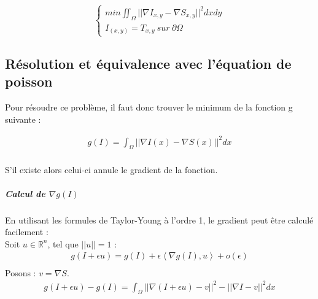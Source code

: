\begin{center}
\begin{equation}
\left\{
\begin{aligned}
 min \iint_\Omega || \nabla I_{x,y} - \nabla S_{x,y}||^2 dxdy\\
 I_{(x,y)} = T_{x,y} \ sur\ \partial \Omega
\end{aligned}
\right.
\end{equation}
\end{center}


\subsection{Résolution et équivalence avec l'équation de poisson}
Pour résoudre ce problème, il faut donc trouver le minimum de la fonction g suivante  : 
\begin{center}
\begin{equation}
\begin{aligned}
g(I) = \int_\Omega || \nabla I(x) - \nabla S(x)||^2 dx\\
\end{aligned}
\end{equation}
\end{center}
S'il existe alors celui-ci annule le gradient de la fonction. 
\subparagraph{Calcul de $\nabla g(I)$ }
En utilisant les formules de Taylor-Young à l'ordre 1, le gradient peut être calculé facilement :\\
Soit $u \in \mathbb{R}^n$, tel que $||u||=1$ :
\begin{equation*}
\begin{aligned}
g(I+\epsilon u) = g(I) +\epsilon \left<\nabla g(I), u\right> + o(\epsilon)\\
\end{aligned}
\end{equation*}
Posons : $v = \nabla S$.
\begin{equation*} 
\begin{aligned}
    g(I+\epsilon u) -g(I) =  \int_\Omega || \nabla (I+\epsilon u) - v||^2 - ||\nabla I -v ||^2 dx\\
\end{aligned}
\end{equation*} 
